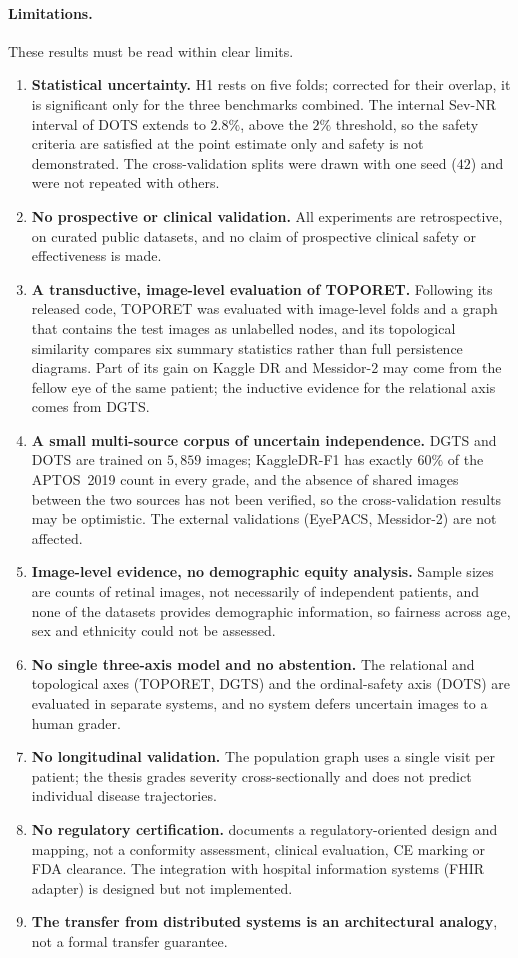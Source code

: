 \paragraph{Limitations.}
These results must be read within clear limits.
\begin{enumerate}[leftmargin=1.6em,itemsep=2pt]
\item \textbf{Statistical uncertainty.} H1 rests on five folds; corrected for their
overlap, it is significant only for the three benchmarks combined. The internal Sev-NR
interval of DOTS extends to $2.8\%$, above the $2\%$ threshold, so the safety criteria are
satisfied at the point estimate only and safety is not demonstrated. The
cross-validation splits were drawn with one seed ($42$) and were not repeated with others.
\item \textbf{No prospective or clinical validation.} All experiments are retrospective, on
curated public datasets, and no claim of prospective clinical safety or effectiveness is
made.
\item \textbf{A transductive, image-level evaluation of TOPORET.} Following its released
code, TOPORET was evaluated with image-level folds and a graph that contains the test
images as unlabelled nodes, and its topological similarity compares six summary
statistics rather than full persistence diagrams. Part of its gain on Kaggle DR and
Messidor-2 may come from the fellow eye of the same patient; the inductive evidence for
the relational axis comes from DGTS.
\item \textbf{A small multi-source corpus of uncertain independence.} DGTS and DOTS are
trained on $5{,}859$ images; KaggleDR-F1 has exactly $60\%$ of the APTOS~2019 count in
every grade, and the absence of shared images between the two sources has not been
verified, so the cross-validation results may be optimistic. The external validations
(EyePACS, Messidor-2) are not affected.
\item \textbf{Image-level evidence, no demographic equity analysis.} Sample sizes are
counts of retinal images, not necessarily of independent patients, and none of the datasets
provides demographic information, so fairness across age, sex and ethnicity could not be
assessed.
\item \textbf{No single three-axis model and no abstention.} The relational and topological
axes (TOPORET, DGTS) and the ordinal-safety axis (DOTS) are evaluated in separate
systems, and no system defers uncertain images to a human grader.
\item \textbf{No longitudinal validation.} The population graph uses a single visit per
patient; the thesis grades severity cross-sectionally and does not predict individual
disease trajectories.
\item \textbf{No regulatory certification.}  documents a
regulatory-oriented design and mapping, not a conformity assessment, clinical evaluation,
CE marking or FDA clearance. The integration with hospital information systems (FHIR
adapter) is designed but not implemented.
\item \textbf{The transfer from distributed systems is an architectural analogy}, not a
formal transfer guarantee.
\end{enumerate}
